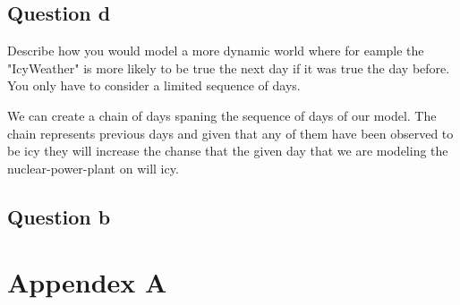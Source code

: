 \documentclass[a4paper,12pt]{article}
\begin{document}
\subsection*{Question d}
Describe how you would model a more dynamic world where for eample the "IcyWeather" is more likely to be true the next day if it was true the day before. You only have to consider a limited sequence of days.

We can create a chain of days spaning the sequence of days of our model. The chain represents previous days and given that any of them have been observed to be icy they will increase the chanse that the given day that we are modeling the nuclear-power-plant on will icy.


\subsection*{Question b}


\section*{Appendex A}
\end{document}
